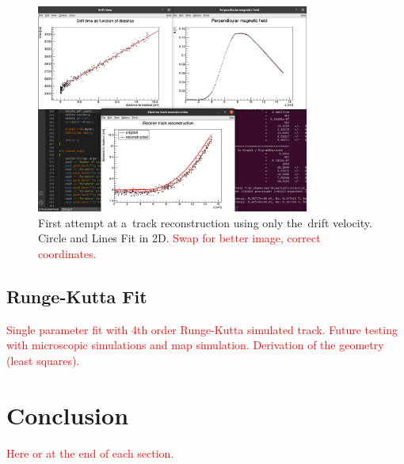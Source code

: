 \documentclass[]{article}
\begin{document}
			\begin{figure}
				\centering
				\includegraphics[width=0.8\textwidth]{9010_circle2D.png}
				\caption{First attempt at a~track reconstruction using only the~drift velocity. Circle and Lines Fit in 2D. \textcolor{red}{Swap for better image, correct coordinates.}}
				\label{fig:9010circle2D}
			\end{figure}
		
		\subsection{Runge-Kutta Fit}
			\textcolor{red}{Single parameter fit with 4th order Runge-Kutta simulated track. Future testing with microscopic simulations and map simulation. Derivation of the geometry (least squares).}
		
	\section{Conclusion}
		\textcolor{red}{Here or at the end of each section.}
		
	
	
	
	
\end{document}
